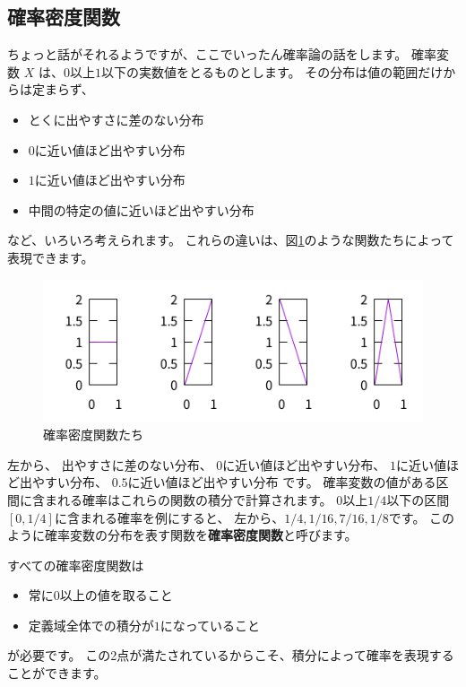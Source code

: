 \documentclass[uplatex,dvipdfmx]{jsarticle}
\begin{document}
\subsection{確率密度関数}
  ちょっと話がそれるようですが、ここでいったん確率論の話をします。
  確率変数 $X$ は、$0$以上$1$以下の実数値をとるものとします。
  その分布は値の範囲だけからは定まらず、
  \begin{itemize}
  \item とくに出やすさに差のない分布
  \item $0$に近い値ほど出やすい分布
  \item $1$に近い値ほど出やすい分布
  \item 中間の特定の値に近いほど出やすい分布
  \end{itemize}
  など、いろいろ考えられます。
  これらの違いは、図\ref{distributions}のような関数たちによって表現できます。
  \begin{figure}
    \centering
    \includegraphics[width=15cm]{distributions.png}
    \caption{確率密度関数たち}
    \label{distributions}
  \end{figure}
  左から、
  出やすさに差のない分布、
  $0$に近い値ほど出やすい分布、
  $1$に近い値ほど出やすい分布、
  $0.5$に近い値ほど出やすい分布
  です。
  確率変数の値がある区間に含まれる確率はこれらの関数の積分で計算されます。
  $0$以上$1/4$以下の区間$[0,1/4]$に含まれる確率を例にすると、
  左から、$1/4, 1/16, 7/16, 1/8$です。
  このように確率変数の分布を表す関数を\textbf{確率密度関数}と呼びます。

  すべての確率密度関数は
  \begin{itemize}
    \item 常に$0$以上の値を取ること
    \item 定義域全体での積分が$1$になっていること
  \end{itemize}
  が必要です。
  この2点が満たされているからこそ、積分によって確率を表現することができます。
\end{document}
